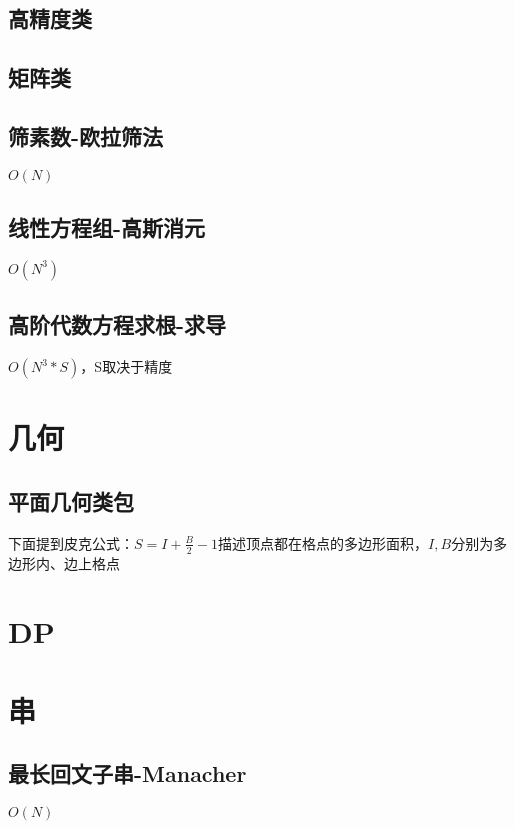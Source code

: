 \documentclass[10pt]{article}
\begin{document}
\subsection{高精度类}


\subsection{矩阵类}


\subsection{筛素数-欧拉筛法}
$O(N)$


\subsection{线性方程组-高斯消元}
$O(N^3)$


\subsection{高阶代数方程求根-求导}
$O(N^3*S)$，S取决于精度

\section{几何}
\subsection{平面几何类包}
下面提到皮克公式：$S=I+\frac{B}{2}-1$描述顶点都在格点的多边形面积，$I, B$分别为多边形内、边上格点

\section{DP}
\section{串}
\subsection{最长回文子串-Manacher}
$O(N)$

\end{document}
